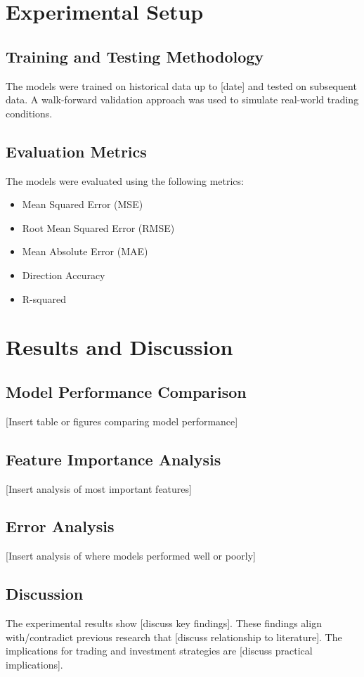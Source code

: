 \documentclass[12pt,a4paper]{article}
\begin{document}
\section{Experimental Setup}
\subsection{Training and Testing Methodology}
The models were trained on historical data up to [date] and tested on subsequent data. A walk-forward validation approach was used to simulate real-world trading conditions.

\subsection{Evaluation Metrics}
The models were evaluated using the following metrics:
\begin{itemize}
    \item Mean Squared Error (MSE)
    \item Root Mean Squared Error (RMSE)
    \item Mean Absolute Error (MAE)
    \item Direction Accuracy
    \item R-squared
\end{itemize}

\section{Results and Discussion}
\subsection{Model Performance Comparison}
[Insert table or figures comparing model performance]

\subsection{Feature Importance Analysis}
[Insert analysis of most important features]

\subsection{Error Analysis}
[Insert analysis of where models performed well or poorly]

\subsection{Discussion}
The experimental results show [discuss key findings]. These findings align with/contradict previous research that [discuss relationship to literature]. The implications for trading and investment strategies are [discuss practical implications].
\end{document}
